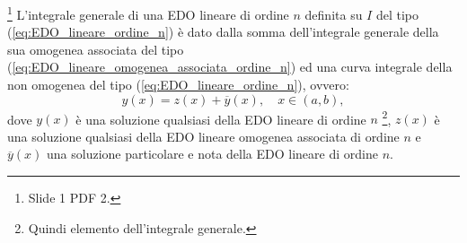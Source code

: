 \begin{theorem}\label{th:rappresentazione_integrale_generale_EDO_lineare}\footnote{Slide 1 PDF 2.}
    L'integrale generale di una EDO lineare di ordine $n$ definita su $I$ del tipo (\ref{eq:EDO_lineare_ordine_n}) è dato dalla somma dell'integrale generale della sua omogenea associata del tipo (\ref{eq:EDO_lineare_omogenea_associata_ordine_n}) ed una curva integrale della non omogenea  del tipo (\ref{eq:EDO_lineare_ordine_n}), ovvero:
    \begin{equation}\label{eq:rappresentazione_integrale_generale_EDO_lineare}
        y(x)=z(x)+\overline{y}(x),\quad x\in(a,b),
    \end{equation}
    dove $y(x)$ è una soluzione qualsiasi della EDO lineare di ordine $n$ \footnote{Quindi elemento dell'integrale generale.}, $z(x)$ è una soluzione qualsiasi della EDO lineare omogenea associata di ordine $n$ e $\overline{y}(x)$ una soluzione particolare e nota della EDO lineare di ordine $n$. 
\end{theorem} 

